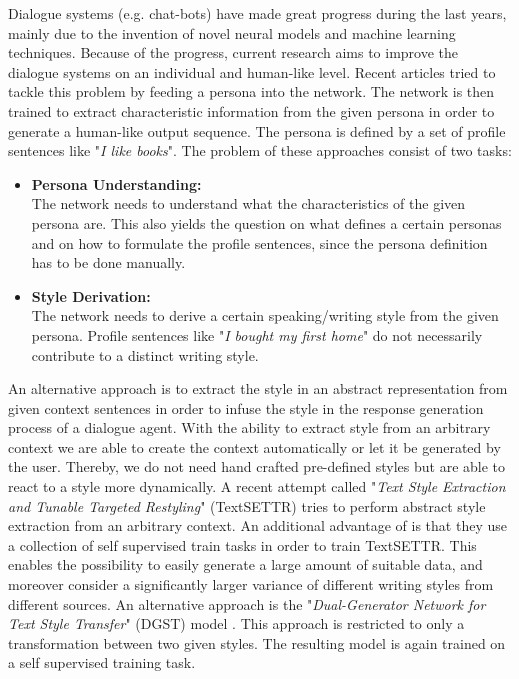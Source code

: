 \documentclass[twocolumn]{tum-article}
\begin{document}
Dialogue systems (e.g. chat-bots) have made great progress during the last years, mainly due to the invention of novel neural models and machine learning techniques. Because of the progress, current research aims to improve the dialogue systems on an individual and human-like level. Recent articles \cite{DBLP:journals/corr/abs-1901-08149, liu2020impress} tried to tackle this problem by feeding a persona into the network. The network is then trained to extract characteristic information from the given persona in order to generate a human-like output sequence. The persona is defined by a set of profile sentences like "\textit{I like books}". The problem of these approaches consist of two tasks:
\begin{itemize}
\item \textbf{Persona Understanding:}\\
The network needs to understand what the characteristics of the given persona are. This also yields the question on what defines a certain personas and on how to formulate the profile sentences, since the persona definition has to be done manually. 
\item \textbf{Style Derivation:}\\
The network needs to derive a certain speaking/writing style from the given persona. Profile sentences like "\textit{I bought my first home}" \cite{liu2020impress} do not necessarily contribute to a distinct writing style.
\end{itemize}
An alternative approach is to extract the style in an abstract representation from given context sentences in order to infuse the style in the response generation process of a dialogue agent. With the ability to extract style from an arbitrary context we are able to create the context automatically or let it be generated by the user. Thereby, we do not need hand crafted pre-defined styles but are able to react to a style more dynamically. A recent attempt called "\textit{Text Style Extraction and Tunable Targeted Restyling}" (TextSETTR) \cite{riley2020textsettr} tries to perform abstract style extraction from an arbitrary context. An additional advantage of \cite{riley2020textsettr} is that they use a collection of self supervised train tasks in order to train TextSETTR. This enables the possibility to easily generate a large amount of suitable data, and moreover consider a significantly larger variance of different writing styles from different sources. 
An alternative approach is the "\textit{Dual-Generator Network for Text Style Transfer}" (DGST) model \cite{li2020dgst}. This approach is restricted to only a transformation between two given styles. The resulting model is again trained on a self supervised training task.\\
\end{document}
